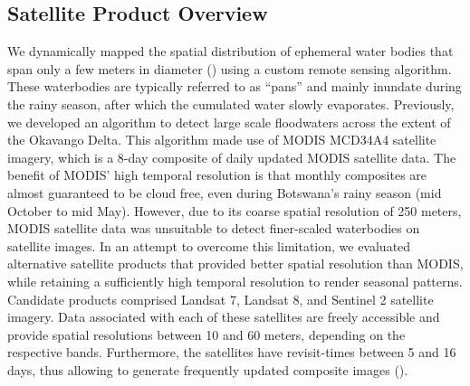\documentclass[abstract=on,10pt,a4paper,bibliography=totocnumbered]{article}
\begin{document}
\subsection{Satellite Product Overview}

We dynamically mapped the spatial distribution of ephemeral water bodies that
span only a few meters in diameter () using a custom remote sensing algorithm.
These waterbodies are typically referred to as ``pans'' and mainly inundate
during the rainy season, after which the cumulated water slowly evaporates.
Previously, we developed an algorithm to detect large scale floodwaters across
the extent of the Okavango Delta. This algorithm made use of MODIS MCD34A4
satellite imagery, which is a 8-day composite of daily updated MODIS satellite
data. The benefit of MODIS' high temporal resolution is that monthly composites
are almost guaranteed to be cloud free, even during Botswana's rainy season (mid
October to mid May). However, due to its coarse spatial resolution of 250
meters, MODIS satellite data was unsuitable to detect finer-scaled waterbodies
on satellite images. In an attempt to overcome this limitation, we evaluated
alternative satellite products that provided better spatial resolution than
MODIS, while retaining a sufficiently high temporal resolution to render
seasonal patterns. Candidate products comprised Landsat 7, Landsat 8, and
Sentinel 2 satellite imagery. Data associated with each of these satellites are
freely accessible and provide spatial resolutions between 10 and 60 meters,
depending on the respective bands. Furthermore, the satellites have
revisit-times between 5 and 16 days, thus allowing to generate frequently
updated composite images ().
\end{document}
